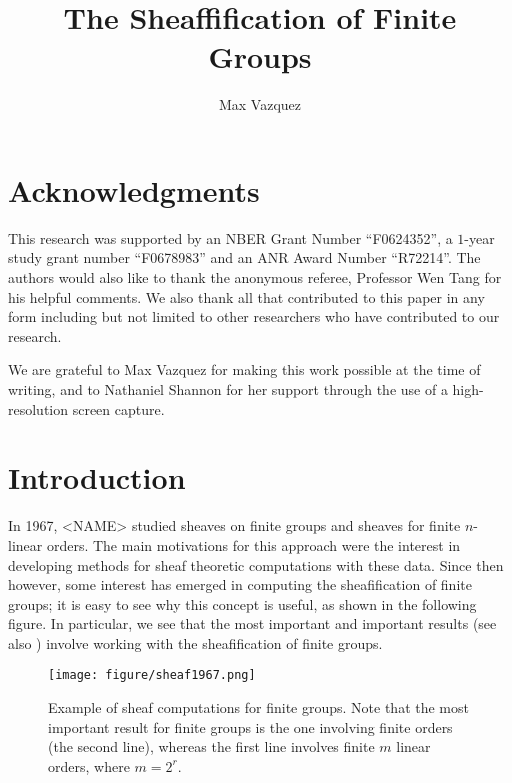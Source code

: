\documentclass[a4paper,reqno,oneside]{article}
\begin{document}
\title{The Sheaffification of Finite Groups}
\author{Max Vazquez}
\maketitle


\section*{Acknowledgments}
This research was supported by an NBER Grant Number ``F0624352'', a $1$-year study grant number ``F0678983'' and an ANR Award Number ``R72214''. The authors would also like to thank the anonymous referee, Professor Wen Tang for his helpful comments. We also thank all that contributed to this paper in any form including but not limited to other researchers who have contributed to our research. 


We are grateful to Max Vazquez for making this work possible at the time of writing, and to Nathaniel Shannon for her support through the use of a high-resolution screen capture. 

\section{Introduction}
In 1967, <NAME> \cite{Frey1967} studied sheaves on finite groups and sheaves for finite $n$-linear orders. The main motivations for this approach were the interest in developing methods for sheaf theoretic computations with these data. Since then however, some interest has emerged in computing the sheafification of finite groups; it is easy to see why this concept is useful, as shown in the following figure. In particular, we see that the most important and important results (see also \cite{Hovey1996b}) involve working with the sheafification of finite groups. 

\begin{figure}[h]
    \texttt{[image: figure/sheaf1967.png]}
    \caption{Example of sheaf computations for finite groups. Note that the most important result for finite groups is the one involving finite orders (the second line), whereas the first line involves finite $m$ linear orders, where $m = 2^r$. } 
    \label{fig:sheaf607}
\end{figure}
\end{document}
